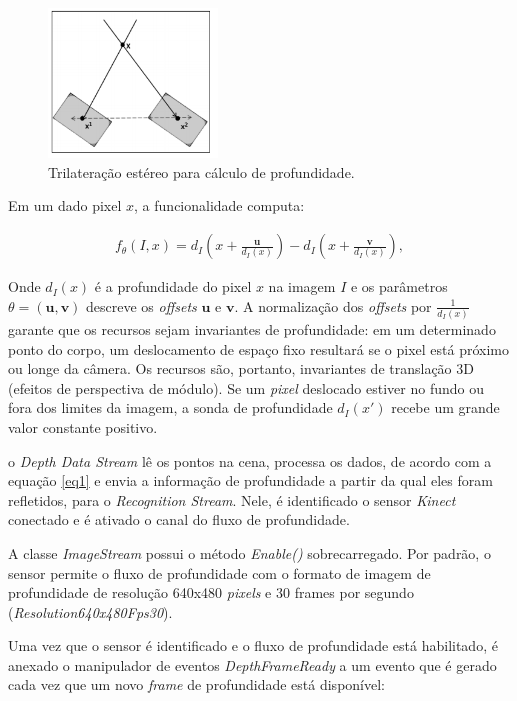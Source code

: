 \begin{figure}[!h]
\centering
\includegraphics[width=0.4\textwidth]{images/trilateracao_estereo.png}
\caption{Trilateração estéreo para cálculo de profundidade.}
\label{fig:trilatStereo}
\end{figure}

Em um dado pixel $x$, a funcionalidade computa: 


\begin{align}
{f_{\theta}}(I, x) = d_{I}  \left(x + \frac{\boldsymbol{u}}{d_{I}(x)}\right) -  d_{I} \left(x + \frac{\boldsymbol{v}}{d_{I}(x)}\right) ,
\label{eq1}
\end{align}

Onde $d_{I}(x)$ é a profundidade do pixel $x$ na imagem $I$ e os parâmetros $\theta = (\boldsymbol{u,v})$ descreve os \textit{offsets} $\boldsymbol{u}$ e $\boldsymbol{v}$. A normalização dos \textit{offsets} por $\frac{1}{d_{I}(x)}$ garante que os recursos sejam invariantes de profundidade: em um determinado ponto do corpo, um deslocamento de espaço fixo resultará se o pixel está próximo ou longe da câmera. Os recursos são, portanto, invariantes de translação 3D (efeitos de perspectiva de módulo). Se um \textit{pixel} deslocado estiver no fundo ou fora dos limites da imagem, a sonda de profundidade $d_{I}(x')$ recebe um grande valor constante positivo.

o \textit{Depth Data Stream} lê os pontos na cena, processa os dados, de acordo com a equação \ref{eq1} e envia a informação de profundidade a partir da qual eles foram refletidos, para o \textit{Recognition Stream}. Nele, é identificado o sensor \textit{Kinect} conectado e é ativado o canal do fluxo de profundidade.

A classe \textit{ImageStream} possui o método \textit{Enable()} sobrecarregado. Por padrão, o sensor permite o fluxo de profundidade com o formato de imagem de profundidade de resolução 640x480 \textit{pixels} e 30 frames por segundo (\textit{Resolution640x480Fps30}).

Uma vez que o sensor é identificado e o fluxo de profundidade está habilitado, é anexado o manipulador de eventos \textit{DepthFrameReady} a um evento que é gerado cada vez que um novo \textit{frame} de profundidade está disponível:

